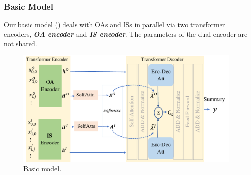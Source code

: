 %
%
%
%
	
\subsubsection{Basic Model}
\label{sec:basicmodel}
Our basic model () deals with OAs and ISs
in parallel via two transformer encoders, \textbf{\em OA encoder} and \textbf{\em IS encoder}. 
The parameters of the dual encoder are not shared.

\begin{figure}[th]
	\centering
	\includegraphics[width=1\linewidth]{./AMD.pdf}
	\caption{Basic model.}
	\label{fig:amd}
\end{figure}

